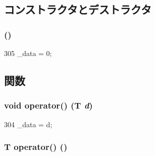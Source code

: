 \subsection{コンストラクタとデストラクタ}
\hypertarget{structiGbReg_1_1Regs_1_1Reg_a93961d9c207640497631d54c51526721}{
\subsubsection[{Reg}]{ ()}}
\label{structiGbReg_1_1Regs_1_1Reg_a93961d9c207640497631d54c51526721}



\begin{DoxyCode}
305 { _data = 0; }
\end{DoxyCode}


\subsection{関数}
\hypertarget{structiGbReg_1_1Regs_1_1Reg_ad75a4d427f25956add1791f7b59fe1cb}{
\subsubsection[{operator()}]{\setlength{\rightskip}{0pt plus 5cm}void operator() (T {\em d})}}
\label{structiGbReg_1_1Regs_1_1Reg_ad75a4d427f25956add1791f7b59fe1cb}



\begin{DoxyCode}
304 { _data = d; }
\end{DoxyCode}
\hypertarget{structiGbReg_1_1Regs_1_1Reg_aaba2db6079c528211c6b095cdb08fcf6}{
\subsubsection[{operator()}]{\setlength{\rightskip}{0pt plus 5cm}T operator() ()}}
\label{structiGbReg_1_1Regs_1_1Reg_aaba2db6079c528211c6b095cdb08fcf6}



